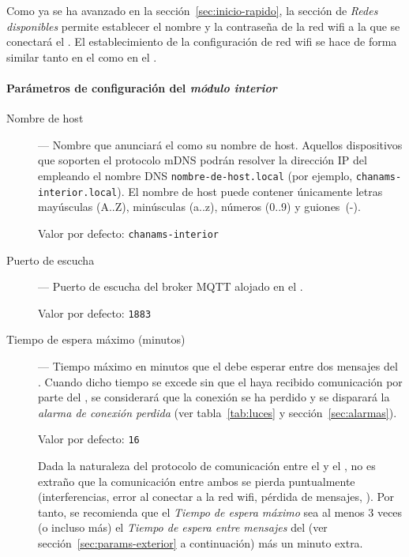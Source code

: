 Como ya se ha avanzado en la sección~\ref{sec:inicio-rapido}, la sección de \emph{Redes disponibles} permite establecer el nombre y la contraseña de la red wifi a la que se conectará el \CMS. El establecimiento de la configuración de red wifi se hace de forma similar tanto en el \MIE como en el \MEE. 

\paragraph{Parámetros de configuración del \textit{módulo interior}}
\label{sec:params-interior}

\begin{description}

  \item[Nombre de host] --- Nombre que anunciará el \MIE como su nombre de host. Aquellos dispositivos que soporten el protocolo mDNS podrán resolver la dirección IP del \MI empleando el nombre DNS \texttt{nombre-de-host\allowbreak.\allowbreak\-lo\-cal} (por ejemplo, \texttt{chanams-interior.local}). El nombre de host puede contener únicamente letras mayúsculas (A..Z), minúsculas (a..z), números (0..9) y \mbox{guiones~(-)}.
  
  Valor por defecto: \texttt{chanams-interior}
  
  \item[Puerto de escucha] --- Puerto de escucha del broker MQTT alojado en el \MIE.

  Valor por defecto: \texttt{1883}
  
  \item[Tiempo de espera máximo (minutos)] --- Tiempo máximo en minutos que el \MIE debe esperar entre dos mensajes del \MEE. Cuando dicho tiempo se excede sin que el \MI haya recibido comunicación por parte del \ME, se considerará que la conexión se ha perdido y se disparará la \emph{alarma de conexión perdida} (ver tabla~\ref{tab:luces} y sección~\ref{sec:alarmas}).
  
  Valor por defecto: \texttt{16}
  
  Dada la naturaleza del protocolo de comunicación entre el \MEE y el \MIE, no es extraño que la comunicación entre ambos se pierda puntualmente (interferencias, error al conectar a la red wifi, pérdida de mensajes, \etc). Por tanto, se recomienda que el \emph{Tiempo de espera máximo} sea al menos 3 veces (o incluso más) el \emph{Tiempo de espera entre mensajes} del \MEE (ver sección~\ref{sec:params-exterior} a continuación) más un minuto extra.
  

\end{description}
